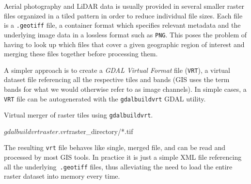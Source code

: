 Aerial photography and LiDAR data is usually provided in several smaller raster files organized in a tiled pattern in order to reduce individual file sizes.
Each file is a \texttt{.geotiff} file, a container format which specifies relevant metadata and the underlying image data in a lossless format such as \texttt{PNG}.
This poses the problem of having to look up which files that cover a given geographic region of interest and merging these files together before processing them.

A simpler approach is to create a \textit{GDAL Virtual Format} file (\texttt{VRT}), a virtual dataset file referencing all the respective tiles and bands (GIS uses the term bands for what we would otherwise refer to as image channels).
In simple cases, a \texttt{VRT} file can be autogenerated with the \texttt{gdalbuildvrt} GDAL utility.
%
\begin{listing}[H]
  \caption{Virtual merger of raster tiles using \texttt{gdalbuildvrt}.}
  \begin{shellcode}
  $ gdalbuildvrt raster.vrt ${raster_directory}/*.tif
  \end{shellcode}
\end{listing}
\noindent
The resulting \texttt{vrt} file behaves like single, merged file, and can be read and processed by most GIS tools.
In practice it is just a simple XML file referencing all the underlying\ \texttt{.geotiff} files, thus alleviating the need to load the entire raster dataset into memory every time.

